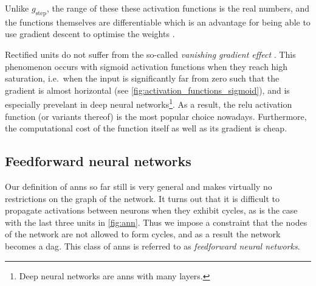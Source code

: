 \documentclass[../report.tex]{subfiles}
\begin{document}
Unlike $g_\text{step}$, the range of these these activation functions is the real numbers, and the functions themselves are differentiable which is an advantage for being able to use gradient descent to optimise the weights \cite[729]{russell2010}.

Rectified units do not suffer from the so-called \emph{vanishing gradient effect} \cite{glorot2011}.
This phenomenon occurs with sigmoid activation functions when they reach high saturation, i.e.\ when the input is significantly far from zero such that the gradient is almost horizontal (see \cref{fig:activation_functions_sigmoid}), and is especially prevelant in deep neural networks\footnote{Deep neural networks are \glspl{ann} with many layers.}.
As a result, the \gls{relu} activation function (or variants thereof) is the most popular choice nowadays.
Furthermore, the computational cost of the function itself as well as its gradient is cheap.

\subsection{Feedforward neural networks}
Our definition of \glspl{ann} so far still is very general and makes virtually no restrictions on the graph of the network.
It turns out that it is difficult to propagate activations between neurons when they exhibit cycles, as is the case with the last three units in \cref{fig:ann}.
Thus we impose a constraint that the nodes of the network are not allowed to form cycles, and as a result the network becomes a \gls{dag}.
This class of \glspl{ann} is referred to as \emph{feedforward neural networks}.
\end{document}
